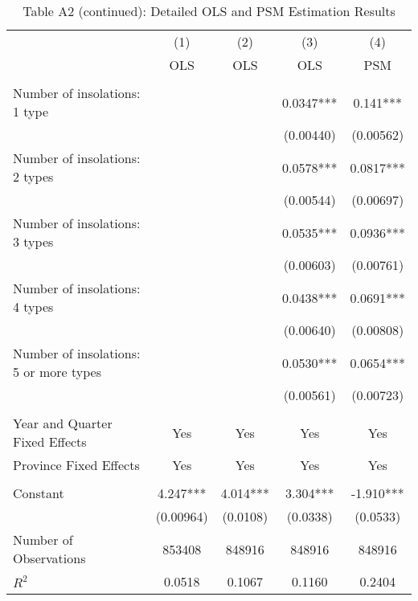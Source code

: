 \documentclass[12pt]{article}
\begin{document}
\begin{table}[H]
\scriptsize
  \centering
  \caption*{Table A2 (continued): Detailed OLS and PSM Estimation Results}
      \begin{tabular}{lcccc}
\hline
                &\multicolumn{1}{c}{(1)}&\multicolumn{1}{c}{(2)}&\multicolumn{1}{c}{(3)}&\multicolumn{1}{c}{(4)}\\
& OLS                      & OLS & OLS & PSM \\
\hline
&&&&\\
Number of insolations: 1 type                          &            &             & 0.0347***   & 0.141***     \\
                                &            &             & (0.00440)   & (0.00562)    \\
Number of insolations: 2 types                         &            &             & 0.0578***   & 0.0817***    \\
                                &            &             & (0.00544)   & (0.00697)    \\
Number of insolations: 3 types                         &            &             & 0.0535***   & 0.0936***    \\
                                &            &             & (0.00603)   & (0.00761)    \\
Number of insolations: 4 types                         &            &             & 0.0438***   & 0.0691***    \\
                                &            &             & (0.00640)   & (0.00808)    \\
Number of insolations: 5 or more types                 &            &             & 0.0530***   & 0.0654***    \\
                                &            &             & (0.00561)   & (0.00723)    \\
&&&&\\
Year and Quarter Fixed Effects&Yes	& Yes &	Yes & Yes\\
Province Fixed Effects&Yes	& Yes &	Yes & Yes\\

&&&&\\

Constant                          & 4.247***   & 4.014***    & 3.304***    & -1.910***    \\
                                & (0.00964)  & (0.0108)    & (0.0338)    & (0.0533)     \\
Number of Observations                               & 853408     & 848916      & 848916      & 848916  \\    
$R^2$ & 0.0518 & 0.1067 & 0.1160 & 0.2404
\\


\end{tabular}
\end{table}
\end{document}
